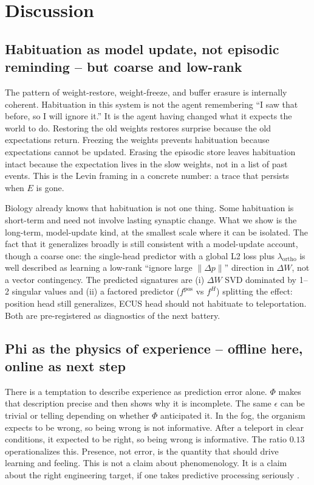 \documentclass[11pt,a4paper]{article}
\begin{document}
\section{Discussion}
\label{sec:discussion}

\subsection{Habituation as model update, not episodic reminding -- but coarse and low-rank}

The pattern of weight-restore, weight-freeze, and buffer erasure is internally coherent. Habituation in this system is not the agent remembering ``I saw that before, so I will ignore it.'' It is the agent having changed what it expects the world to do. Restoring the old weights restores surprise because the old expectations return. Freezing the weights prevents habituation because expectations cannot be updated. Erasing the episodic store leaves habituation intact because the expectation lives in the slow weights, not in a list of past events. This is the Levin framing in a concrete number: a trace that persists when $E$ is gone.

Biology already knows that habituation is not one thing. Some habituation is short-term and need not involve lasting synaptic change. What we show is the long-term, model-update kind, at the smallest scale where it can be isolated. The fact that it generalizes broadly is still consistent with a model-update account, though a coarse one: the single-head predictor with a global L2 loss plus $\lambda_{\mathrm{ortho}}$ is well described as learning a low-rank ``ignore large $\| \Delta p \|$'' direction in $\Delta W$, not a vector contingency. The predicted signatures are (i) $\Delta W$ SVD dominated by 1--2 singular values and (ii) a factored predictor ($f^{\mathrm{pos}}$ vs $f^{H}$) splitting the effect: position head still generalizes, ECUS head should not habituate to teleportation. Both are pre-registered as diagnostics of the next battery.

\subsection{Phi as the physics of experience -- offline here, online as next step}

There is a temptation to describe experience as prediction error alone. $\Phi$ makes that description precise and then shows why it is incomplete. The same $\epsilon$ can be trivial or telling depending on whether $\Phi$ anticipated it. In the fog, the organism expects to be wrong, so being wrong is not informative. After a teleport in clear conditions, it expected to be right, so being wrong is informative. The ratio $0.13$ operationalizes this. Presence, not error, is the quantity that should drive learning and feeling. This is not a claim about phenomenology. It is a claim about the right engineering target, if one takes predictive processing seriously \cite{friston2010, laukkonen2025}.
\end{document}
